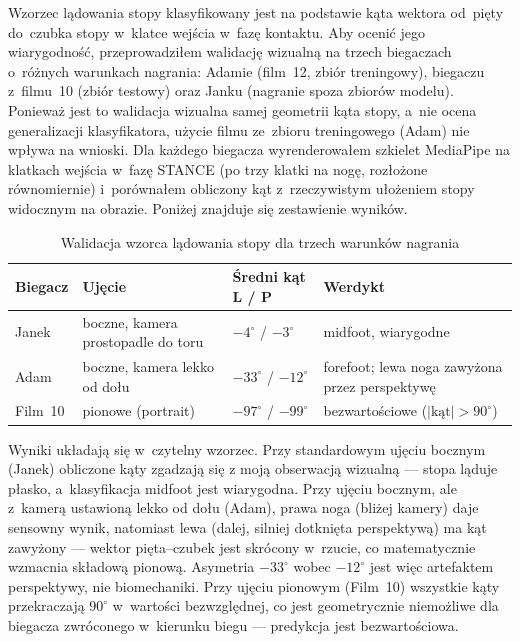 Wzorzec lądowania stopy klasyfikowany jest na podstawie kąta wektora od~pięty do~czubka stopy w~klatce wejścia w~fazę kontaktu. Aby ocenić jego wiarygodność, przeprowadziłem walidację wizualną na trzech biegaczach o~różnych warunkach nagrania: Adamie (film~12, zbiór treningowy), biegaczu z~filmu~10 (zbiór testowy) oraz Janku (nagranie spoza zbiorów modelu). Ponieważ jest to walidacja wizualna samej geometrii kąta stopy, a~nie ocena generalizacji klasyfikatora, użycie filmu ze~zbioru treningowego (Adam) nie wpływa na wnioski. Dla każdego biegacza wyrenderowałem szkielet MediaPipe na klatkach wejścia w~fazę STANCE (po trzy klatki na nogę, rozłożone równomiernie) i~porównałem obliczony kąt z~rzeczywistym ułożeniem stopy widocznym na obrazie. Poniżej znajduje się zestawienie wyników.

\begin{table}[htbp]
\centering
\caption{Walidacja wzorca lądowania stopy dla trzech warunków nagrania}
\label{tab:foot-strike-validation}
\small
\begin{tabular}{p{2.2cm}p{4.2cm}p{2.6cm}p{3.6cm}}
\hline
\textbf{Biegacz} & \textbf{Ujęcie} & \textbf{Średni kąt L / P} & \textbf{Werdykt} \\
\hline
Janek    & boczne, kamera prostopadle do toru & $-4^\circ$ / $-3^\circ$ & midfoot, wiarygodne \\
Adam     & boczne, kamera lekko od dołu & $-33^\circ$ / $-12^\circ$ & forefoot; lewa noga zawyżona przez perspektywę \\
Film~10  & pionowe (portrait) & $-97^\circ$ / $-99^\circ$ & bezwartościowe ($|\text{kąt}| > 90^\circ$) \\
\hline
\end{tabular}
\end{table}

Wyniki układają się w~czytelny wzorzec. Przy standardowym ujęciu bocznym (Janek) obliczone kąty zgadzają się z moją obserwacją wizualną --- stopa ląduje płasko, a~klasyfikacja midfoot jest wiarygodna. Przy ujęciu bocznym, ale z~kamerą ustawioną lekko od dołu (Adam), prawa noga (bliżej kamery) daje sensowny wynik, natomiast lewa (dalej, silniej dotknięta perspektywą) ma kąt zawyżony --- wektor pięta--czubek jest skrócony w~rzucie, co matematycznie wzmacnia składową pionową. Asymetria $-33^\circ$ wobec $-12^\circ$ jest więc artefaktem perspektywy, nie biomechaniki. Przy ujęciu pionowym (Film~10) wszystkie kąty przekraczają $90^\circ$ w~wartości bezwzględnej, co jest geometrycznie niemożliwe dla biegacza zwróconego w~kierunku biegu --- predykcja jest bezwartościowa.

